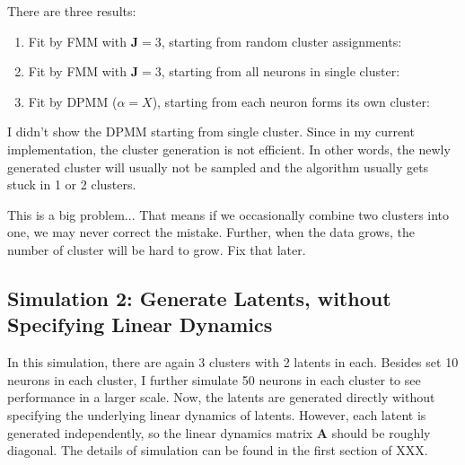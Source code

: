\documentclass[]{article}
\begin{document}
There are three results:
\begin{enumerate}
	\def\labelenumi{(\arabic{enumi})}
	\item
	Fit by FMM with \(\mathbf{J} = 3\), starting from random cluster assignments: 
	\item
	Fit by FMM with \(\mathbf{J} = 3\), starting from all neurons in single cluster: 
	\item
	Fit by DPMM (\(\alpha = X\)), starting from each neuron forms its own cluster:
\end{enumerate}
I didn't show the DPMM starting from single cluster. Since in my current implementation, the cluster generation is not efficient. In other words, the newly generated cluster will usually not be sampled and the algorithm usually gets stuck in 1 or 2 clusters.

This is a big problem... That means if we occasionally combine two clusters into one, we may never correct the mistake. Further, when the data grows, the number of cluster will be hard to grow. Fix that later.

\subsection{Simulation 2: Generate Latents, without Specifying Linear Dynamics}
In this simulation, there are again 3 clusters with 2 latents in each. Besides set 10 neurons in each cluster, I further simulate 50 neurons in each cluster to see performance in a larger scale. Now, the latents are generated directly without specifying the underlying linear dynamics of latents. However, each latent is generated independently, so the linear dynamics matrix \(\mathbf{A}\) should be roughly diagonal. The details of simulation can be found in the first section of XXX.
\end{document}
